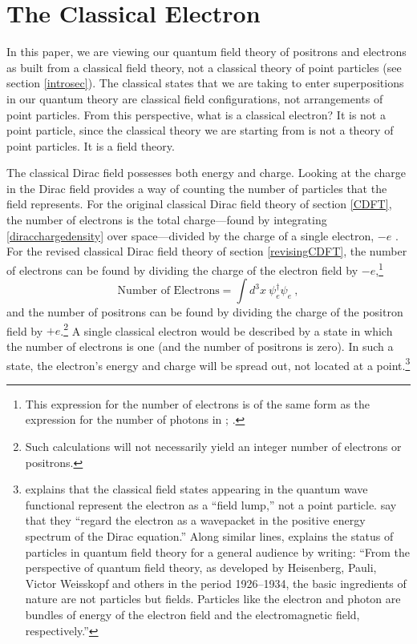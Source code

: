 \documentclass[12pt,secnumarabic,amsmath,amssymb,balancelastpage,nofootinbib]{article}
\begin{document}
\section{The Classical Electron}\label{minsize}

In this paper, we are viewing our quantum field theory of positrons and electrons as built from a classical field theory, not a classical theory of point particles (see section \ref{introsec}).  The classical states that we are taking to enter superpositions in our quantum theory are classical field configurations, not arrangements of point particles.  From this perspective, what is a classical electron?  It is not a point particle, since the classical theory we are starting from is not a theory of point particles.  It is a field theory.

The classical Dirac field possesses both energy and charge.  Looking at the charge in the Dirac field provides a way of counting the number of particles that the field represents.  For the original classical Dirac field theory of section \ref{CDFT}, the number of electrons is the total charge---found by integrating \eqref{diracchargedensity} over space---divided by the charge of a single electron, $-e$ \citep[pg.\ 10]{takabayasi1957}.  For the revised classical Dirac field theory of section \ref{revisingCDFT}, the number of electrons can be found by dividing the charge of the electron field by $-e$,\footnote{This expression for the number of electrons is of the same form as the expression for the number of photons in \citet[pg.\ 1918]{good1957}; \citet[sec.\ 3]{emasqp}.}
\begin{equation}
\mbox{Number of Electrons}=\int{d^3 x \ \psi_e^{\dagger} \psi_e}
\ ,
\end{equation}
and the number of positrons can be found by dividing the charge of the positron field by $+e$.\footnote{Such calculations will not necessarily yield an integer number of electrons or positrons.}  A single classical electron would be described by a state in which the number of electrons is one (and the number of positrons is zero).  In such a state, the electron's energy and charge will be spread out, not located at a point.\footnote{\citet[pg.\ 54]{valentini1992} explains that the classical field states appearing in the quantum wave functional represent the electron as a ``field lump,'' not a point particle.  \citet{chuu2007} say that they ``regard the electron as a wavepacket in the positive energy spectrum of the Dirac equation.''  Along similar lines, \citet[pg.\ 77]{weinberg2018} explains the status of particles in quantum field theory for a general audience by writing: ``From the perspective of quantum field theory, as developed by Heisenberg, Pauli, Victor Weisskopf and others in the period 1926--1934, the basic ingredients of nature are not particles but fields.  Particles like the electron and photon are bundles of energy of the electron field and the electromagnetic field, respectively.''}
\end{document}
